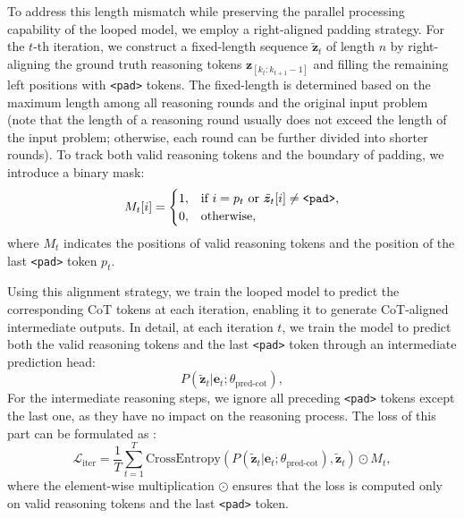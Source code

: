 To address this length mismatch while preserving the parallel processing capability of the looped model, we employ a right-aligned padding strategy. For the $t$-th iteration, we construct a fixed-length sequence $\tilde{\bm{z}}_t$ of length $n$ by right-aligning the ground truth reasoning tokens $\bm{z}_{[k_t:k_{t+1}-1]}$ and filling the remaining left positions with \texttt{<pad>} tokens. The fixed-length is determined based on the maximum length among all reasoning rounds and the original input problem (note that the length of a reasoning round usually does not exceed the length of the input problem; otherwise, each round can be further divided into shorter rounds). 
To track both valid reasoning tokens and the boundary of padding, we introduce a binary mask:
\begin{equation}
M_t[i] = \begin{cases}
1, & \text{if } i = p_t \text{ or } \tilde{\bm{z}}_t[i] \neq \text{\texttt{<pad>}}, \\
0, & \text{otherwise},
\end{cases}
\end{equation}
where $M_t$ indicates the positions of valid reasoning tokens and the position of the last \texttt{<pad>} token $p_t$.

Using this alignment strategy, we train the looped model to predict the corresponding CoT tokens at each iteration, enabling it to generate CoT-aligned intermediate outputs. In detail, at each iteration $t$, we train the model to predict both the valid reasoning tokens and the last \texttt{<pad>} token through an intermediate prediction head:
\begin{equation}
P(\tilde{\bm{z}}_t|\bm e_t; \theta_{\text{pred-cot}}),
\end{equation}
For the intermediate reasoning steps, we ignore all preceding \texttt{<pad>} tokens except the last one, as they have no impact on the reasoning process. The loss of this part can be formulated as :
\begin{equation}
\mathcal{L}_{\text{iter}} = \frac{1}{T}\sum_{t=1}^T \text{CrossEntropy}(P(\tilde{\bm{z}}_t|\bm e_t;\theta_{\text{pred-cot}}), \tilde{\bm{z}}_t) \odot M_t,
\end{equation}
where the element-wise multiplication $\odot$ ensures that the loss is computed only on valid reasoning tokens and the last \texttt{<pad>} token.

